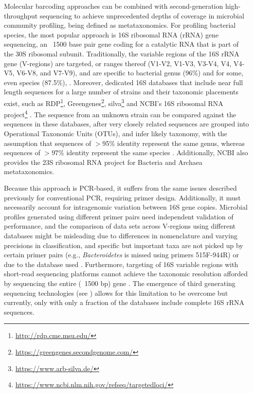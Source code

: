 Molecular barcoding approaches can be combined with second-generation high-throughput sequencing to achieve unprecedented depths of coverage in microbial community profiling, being defined as metataxonomics. For profiling bacterial species, the most popular approach is 16S ribosomal RNA (rRNA) gene sequencing, an ~1500 base pair gene coding for a catalytic RNA that is part of the 30S ribosomal subunit. Traditionally, the variable regions of the 16S rRNA gene (V-regions) are targeted, or ranges thereof (V1-V2, V1-V3, V3-V4, V4, V4-V5, V6-V8, and V7-V9), and are specific to bacterial genus (96\%) and for some, even species (87.5\%), \citep{srinivasan_use_2015, abellan-schneyder_primer_2021}. Moreover, dedicated 16S databases that include near full length sequences for a large number of strains and their taxonomic placements exist, such as RDP\footnote{\url{http://rdp.cme.msu.edu/}}, Greengenes\footnote{\url{https://greengenes.secondgenome.com/}}, silva\footnote{\url{https://www.arb-silva.de/}} and NCBI's 16S ribosomal RNA project\footnote{\url{https://www.ncbi.nlm.nih.gov/refseq/targetedloci/}} \citep{cole_ribosomal_2009, desantis_greengenes_2006, pruesse_silva_2007}. The sequence from an unknown strain can be compared against the sequences in these databases, after very closely related sequences are grouped into Operational Taxonomic Units (OTUs), and infer likely taxonomy, with the assumption that sequences of $>$95\% identity represent the same genus, whereas sequences of $>$97\% identity represent the same species \citep{schloss_introducing_2005}. Additionally, NCBI also provides the 23S ribosomal RNA project for Bacteria and Archaea metataxonomics. 

Because this approach is PCR-based, it suffers from the same issues described previously for conventional PCR, requiring primer design. Additionally, it must necessarily account for intragenomic variation between 16S gene copies. Microbial profiles generated using different primer pairs need independent validation of performance, and the comparison of data sets across V-regions using different databases might be misleading due to differences in nomenclature and varying precisions in classification, and specific but important taxa are not picked up by certain primer pairs (e.g., \textit{Bacteroidetes} is missed using primers 515F-944R) or due to the database used \citep{abellan-schneyder_primer_2021}. Furthermore, targeting of 16S variable regions with short-read sequencing platforms cannot achieve the taxonomic resolution afforded by sequencing the entire (~1500 bp) gene \citep{johnson_evaluation_2019}. The emergence of third generating sequencing technologies (see ) allows for this limitation to be overcome but currently, only with only a fraction of the databases include complete 16S rRNA sequences.

